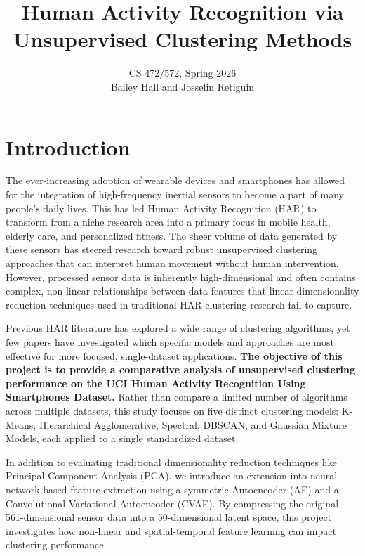 \documentclass[12pt]{IEEEtran}
\begin{document}
\title{Human Activity Recognition via Unsupervised Clustering Methods}
\author{CS 472/572, Spring 2026 \\ Bailey Hall and Josselin Retiguin}

\maketitle

\section{Introduction}
\label{sec:intro}

The ever-increasing adoption of wearable devices and smartphones has allowed for the integration of high-frequency inertial sensors to become a part of many people's daily lives. This has led Human Activity Recognition (HAR) to transform from a niche research area into a primary focus in mobile health, elderly care, and personalized fitness. The sheer volume of data generated by these sensors has steered research toward robust unsupervised clustering approaches that can interpret human movement without human intervention. However, processed sensor data is inherently high-dimensional and often contains complex, non-linear relationships between data features that linear dimensionality reduction techniques used in traditional HAR clustering research fail to capture. 

Previous HAR literature has explored a wide range of clustering algorithms, yet few papers have investigated which specific models and approaches are most effective for more focused, single-dataset applications. \textbf{The objective of this project is to provide a comparative analysis of unsupervised clustering performance on the UCI Human Activity Recognition Using Smartphones Dataset.} Rather than compare a limited number of algorithms across multiple datasets, this study focuses on five distinct clustering models: K-Means, Hierarchical Agglomerative, Spectral, DBSCAN, and Gaussian Mixture Models, each applied to a single standardized dataset.

In addition to evaluating traditional dimensionality reduction techniques like Principal Component Analysis (PCA), we introduce an extension into neural network-based feature extraction using a symmetric Autoencoder (AE) and a Convolutional Variational Autoencoder (CVAE). By compressing the original 561-dimensional sensor data into a 50-dimensional latent space, this project investigates how non-linear and spatial-temporal feature learning can impact clustering performance.
\end{document}
